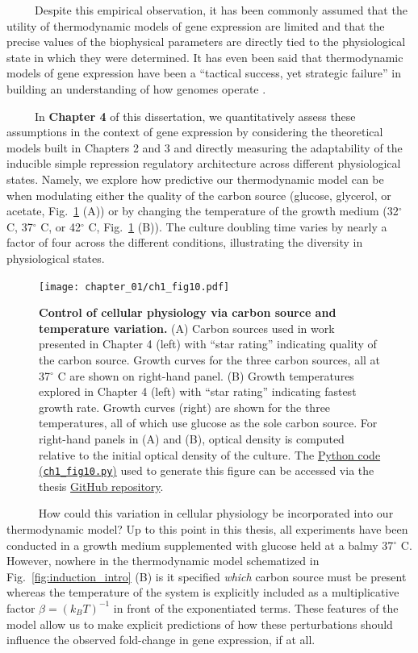 \documentclass[12pt]{caltech_thesis}
\begin{document}
~~~~~Despite this empirical observation, it has been commonly assumed
that the utility of thermodynamic models of gene expression are limited
and that the precise values of the biophysical parameters are directly
tied to the physiological state in which they were determined. It has
even been said that thermodynamic models of gene expression have been a
``tactical success, yet strategic failure'' in building an understanding
of how genomes operate \autocite{phillips2019}.

~~~~~In \textbf{Chapter 4} of this dissertation, we quantitatively
assess these assumptions in the context of gene expression by
considering the theoretical models built in Chapters 2 and 3 and
directly measuring the adaptability of the inducible simple repression
regulatory architecture across different physiological states. Namely,
we explore how predictive our thermodynamic model can be when modulating
either the quality of the carbon source (glucose, glycerol, or acetate,
Fig.~\ref{fig:growth_intro} (A)) or by changing the temperature of the
growth medium (32\(^\circ\) C, 37\(^\circ\) C, or 42\(^\circ\) C,
Fig.~\ref{fig:growth_intro} (B)). The culture doubling time varies by
nearly a factor of four across the different conditions, illustrating
the diversity in physiological states.

\hypertarget{fig:growth_intro}{%
\begin{figure}
\centering
\texttt{[image: chapter\_01/ch1\_fig10.pdf]}
\caption[{Methods of physiological control used in Chapter
4.}]{\textbf{Control of cellular physiology via carbon source and
temperature variation.} (A) Carbon sources used in work presented in
Chapter 4 (left) with ``star rating'' indicating quality of the carbon
source. Growth curves for the three carbon sources, all at 37\(^\circ\)
C are shown on right-hand panel. (B) Growth temperatures explored in
Chapter 4 (left) with ``star rating'' indicating fastest growth rate.
Growth curves (right) are shown for the three temperatures, all of which
use glucose as the sole carbon source. For right-hand panels in (A) and
(B), optical density is computed relative to the initial optical density
of the culture. The
\href{https://github.com/gchure/phd/blob/master/src/chapter_01/code/ch1_fig10.py}{Python
code (\texttt{ch1\_fig10.py})} used to generate this figure can be
accessed via the thesis \href{https://github.com/gchure/phd}{GitHub
repository}.}
\label{fig:growth_intro}
\end{figure}
}

~~~~~ How could this variation in cellular physiology be incorporated
into our thermodynamic model? Up to this point in this thesis, all
experiments have been conducted in a growth medium supplemented with
glucose held at a balmy 37\(^\circ\) C. However, nowhere in the
thermodynamic model schematized in Fig.~\ref{fig:induction_intro} (B) is
it specified \emph{which} carbon source must be present whereas the
temperature of the system is explicitly included as a multiplicative
factor \(\beta = \left(k_BT\right)^{-1}\) in front of the exponentiated
terms. These features of the model allow us to make explicit predictions
of how these perturbations should influence the observed fold-change in
gene expression, if at all.
\end{document}

